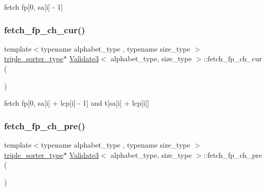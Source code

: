 fetch fp\mbox{[}0, sa\mbox{[}i\mbox{]} -\/ 1\mbox{]} 

\mbox{\label{class_validate3_aeace570606a0320e2ad458145b7e16e3}} 
\subsubsection{\texorpdfstring{fetch\+\_\+fp\+\_\+ch\+\_\+cur()}{fetch\_fp\_ch\_cur()}}
{\footnotesize\ttfamily template$<$typename alphabet\+\_\+type , typename size\+\_\+type $>$ \\
\hyperlink{class_validate3_ab3d4fd99ae8b2967f0b64b71a28efc66}{triple\+\_\+sorter\+\_\+type}$\ast$ \hyperlink{class_validate3}{Validate3}$<$ alphabet\+\_\+type, size\+\_\+type $>$\+::fetch\+\_\+fp\+\_\+ch\+\_\+cur (\begin{DoxyParamCaption}{ }\end{DoxyParamCaption})\hspace{0.3cm}{\ttfamily [inline]}}



fetch fp\mbox{[}0, sa\mbox{[}i\mbox{]} + lcp\mbox{[}i\mbox{]} -\/ 1\mbox{]} and t\mbox{[}sa\mbox{[}i\mbox{]} + lcp\mbox{[}i\mbox{]}\mbox{]} 

\mbox{\label{class_validate3_abbf26d49c2f60ea8ecb3ba131f0a61ae}} 
\subsubsection{\texorpdfstring{fetch\+\_\+fp\+\_\+ch\+\_\+pre()}{fetch\_fp\_ch\_pre()}}
{\footnotesize\ttfamily template$<$typename alphabet\+\_\+type , typename size\+\_\+type $>$ \\
\hyperlink{class_validate3_ab3d4fd99ae8b2967f0b64b71a28efc66}{triple\+\_\+sorter\+\_\+type}$\ast$ \hyperlink{class_validate3}{Validate3}$<$ alphabet\+\_\+type, size\+\_\+type $>$\+::fetch\+\_\+fp\+\_\+ch\+\_\+pre (\begin{DoxyParamCaption}{ }\end{DoxyParamCaption})\hspace{0.3cm}{\ttfamily [inline]}}



